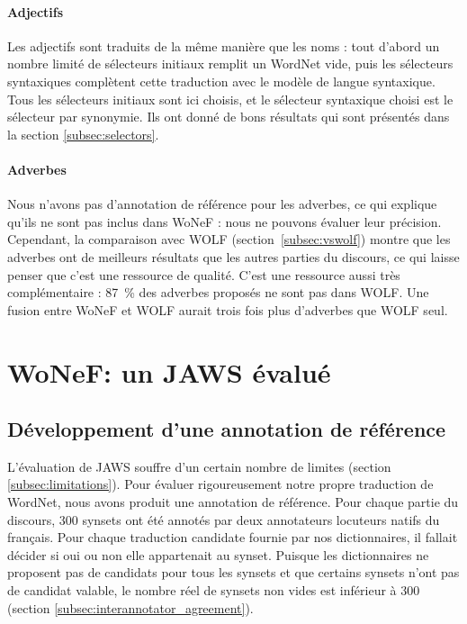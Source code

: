 \paragraph{Adjectifs} Les adjectifs sont traduits de la même manière que les
noms : tout d'abord un nombre limité de sélecteurs initiaux remplit un WordNet
vide, puis les sélecteurs syntaxiques complètent cette traduction avec le
modèle de langue syntaxique. Tous les sélecteurs initiaux sont ici choisis, et
le sélecteur syntaxique choisi est le sélecteur par synonymie. Ils ont donné de
bons résultats qui sont présentés dans la section \ref{subsec:selectors}.

\paragraph{Adverbes}

Nous n'avons pas d'annotation de référence pour les adverbes, ce qui explique
qu'ils ne sont pas inclus dans WoNeF : nous ne pouvons évaluer leur précision.
Cependant, la comparaison avec WOLF (section~\ref{subsec:vswolf}) montre que
les adverbes ont de meilleurs résultats que les autres parties du discours, ce
qui laisse penser que c'est une ressource de qualité. C'est une ressource aussi
très complémentaire : 87~\% des adverbes proposés ne sont pas dans WOLF. Une
fusion entre WoNeF et WOLF aurait trois fois plus d'adverbes que WOLF seul.

\section{WoNeF: un JAWS évalué}
\label{sec:evaluating_jaws}

\subsection{Développement d'une annotation de référence}
\label{subsec:gold_standard}

L'évaluation de JAWS souffre d'un certain nombre de limites (section
\ref{subsec:limitations}). Pour évaluer rigoureusement notre propre traduction
de WordNet, nous avons produit une annotation de référence. Pour chaque partie
du discours, 300 synsets ont été annotés par deux annotateurs locuteurs natifs
du français. Pour chaque traduction candidate fournie par nos dictionnaires, il
fallait décider si oui ou non elle appartenait au synset. Puisque les
dictionnaires ne proposent pas de candidats pour tous les synsets et que
certains synsets n'ont pas de candidat valable, le nombre réel de synsets non
vides est inférieur à 300 (section \ref{subsec:interannotator_agreement}).

